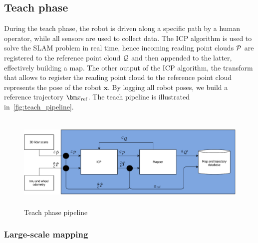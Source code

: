 \subsection{Teach phase}
\label{sec:teach_phase}

During the teach phase, the robot is driven along a specific path by a human operator, while all sensors are used to collect data.
The \ac{ICP} algorithm is used to solve the \ac{SLAM} problem in real time, hence incoming reading point clouds $\mathcal{P}$ are registered to the reference point cloud $\mathcal{Q}$ and then appended to the latter, effectively building a map.
The other output of the \ac{ICP} algorithm, the transform that allows to register the reading point cloud to the reference point cloud \transform{\lidarf}{\mapf} represents the pose of the robot $\bm x$. %
By logging all robot poses, we build a reference trajectory $\reftraj$. %
The teach pipeline is illustrated in~\autoref{fig:teach_pipeline}.

\begin{figure} [htpb]
	\centering
	\includegraphics[height=1.8in]{figs/teach_pipeline/teach_pipeline.pdf}
	\caption{Teach phase pipeline}
	\label{fig:teach_pipeline}
\end{figure}

\subsubsection{Large-scale mapping}
\label{sec:tiled_map}

